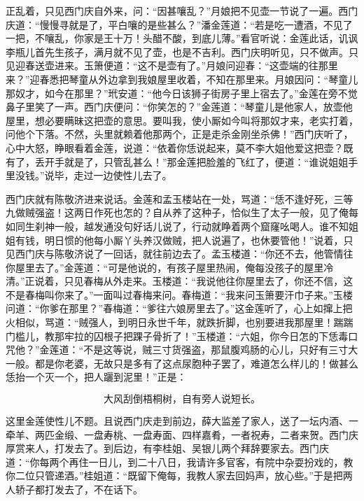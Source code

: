 正乱着，只见西门庆自外来，问：“因甚嚷乱？”月娘把不见壶一节说了一遍。西门庆道：“慢慢寻就是了，平白嚷的是些甚么？”潘金莲道：“若是吃一遭酒，不见了一把，不嚷乱，你家是王十万！头醋不酸，到底儿薄。”看官听说：金莲此话，讥讽李瓶儿首先生孩子，满月就不见了壶，也是不吉利。西门庆明听见，只不做声。只见迎春送壶进来。玉箫便道：“这不是壶有了。”月娘问迎春：“这壶端的往那里来？”迎春悉把琴童从外边拿到我娘屋里收着，不知在那里来。月娘因问：“琴童儿那奴才，如今在那里？”玳安道：“他今日该狮子街房子里上宿去了。”金莲在旁不觉鼻子里笑了一声。西门庆便问：“你笑怎的？”金莲道：“琴童儿是他家人，放壶他屋里，想必要瞒昧这把壶的意思。要叫我，使小厮如今叫将那奴才来，老实打着，问他个下落。不然，头里就赖着他那两个，正是走杀金刚坐杀佛！”西门庆听了，心中大怒，睁眼看着金莲，说道：“依着你恁说起来，莫不李大姐他爱这把壶？既有了，丢开手就是了，只管乱甚么！”那金莲把脸羞的飞红了，便道：“谁说姐姐手里没钱。”说毕，走过一边使性儿去了。

西门庆就有陈敬济进来说话。金莲和孟玉楼站在一处，骂道：“恁不逢好死，三等九做贼强盗！这两日作死也怎的？自从养了这种子，恰似生了太子一般，见了俺每如同生刹神一般，越发通没句好话儿说了，行动就睁着两个窟窿吆喝人。谁不知姐姐有钱，明日惯的他每小厮丫头养汉做贼，把人说遍了，也休要管他！”说着，只见西门庆与陈敬济说了一回话，就往前边去了。孟玉楼道：“你还不去，他管情往你屋里去了。”金莲道：“可是他说的，有孩子屋里热闹，俺每没孩子的屋里冷清。”正说着，只见春梅从外走来。玉楼道：“我说他往你屋里去了，你还不信，这不是春梅叫你来了。”一面叫过春梅来问。春梅道：“我来问玉箫要汗巾子来。”玉楼问道：“你爹在那里？”春梅道：“爹往六娘房里去了。”这金莲听了，心上如撺上把火相似，骂道：“贼强人，到明日永世千年，就跌折脚，也别要进我那屋里！踹踹门槛儿，教那牢拉的囚根子把踝子骨\textShouWai 折了！”玉楼道：“六姐，你今日怎的下恁毒口咒他？”金莲道：“不是这等说，贼三寸货强盗，那鼠腹鸡肠的心儿，只好有三寸大一般。都是你老婆，无故只是多有了这点尿胞种子罢了，难道怎么样儿的！做甚么恁抬一个灭一个，把人躧到泥里！”正是：

\[
大风刮倒梧桐树，自有旁人说短长。
\]

这里金莲使性儿不题。且说西门庆走到前边，薛大监差了家人，送了一坛内酒、一牵羊、两匹金缎、一盘寿桃、一盘寿面、四样嘉肴，一者祝寿，二者来贺。西门庆厚赏来人，打发去了。到后边，有李桂姐、吴银儿两个拜辞要家去。西门庆道：“你每两个再住一日儿，到二十八日，我请许多官客，有院中杂耍扮戏的，教你二位只管递酒。”桂姐道：“既留下俺每，我教人家去回妈声，放心些。”于是把两人轿子都打发去了，不在话下。

